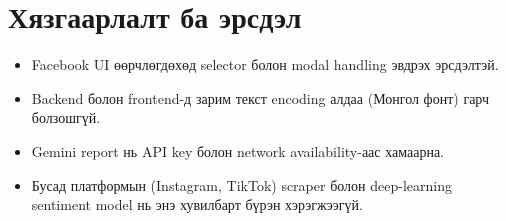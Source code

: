 \section{Хязгаарлалт ба эрсдэл}
\begin{itemize}
    \item Facebook UI өөрчлөгдөхөд selector болон modal handling эвдрэх эрсдэлтэй.
    \item Backend болон frontend-д зарим текст encoding алдаа (Монгол фонт) гарч болзошгүй.
    \item Gemini report нь API key болон network availability-аас хамаарна.
    \item Бусад платформын (Instagram, TikTok) scraper болон deep-learning sentiment model нь энэ хувилбарт бүрэн хэрэгжээгүй.
\end{itemize}
